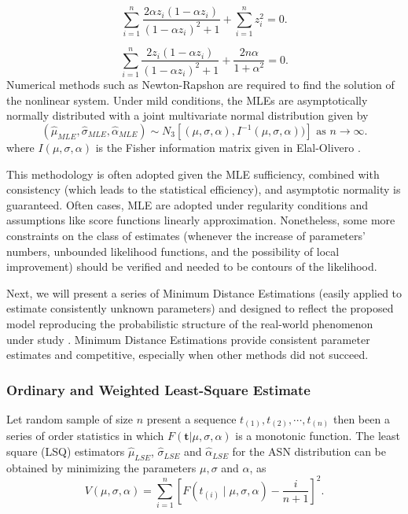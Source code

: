 \documentclass[]{interact}
\theoremstyle{plain}%
\theoremstyle{definition}
\theoremstyle{remark}
\begin{document}
\begin{equation}\label{verogg22} 
\sum_{i=1}^{n}\frac{2\alpha z_i (1-\alpha z_i)}{(1-\alpha z_i)^2+1} +  \sum_{i=1}^{n} z_i ^2=0.
\end{equation}

\begin{equation}\label{verogg23} 
\sum_{i=1}^{n}\frac{2z_i(1-\alpha z_i)}{(1-\alpha z_i)^2 + 1} +\frac{2n\alpha }{1+\alpha^2}=0 .
\end{equation}
Numerical methods such as Newton-Rapshon are required to find the solution of the nonlinear system. Under mild conditions, the MLEs  are asymptotically normally distributed with a joint multivariate normal distribution given by
\begin{equation*}
(\hat{\mu}_{MLE},\hat{\sigma}_{MLE},\hat{\alpha}_{MLE})\sim N_3\left[(\mu,\sigma,\alpha),I^{-1}(\mu,\sigma,\alpha))\right] \mbox{ as } n \to \infty .
\end{equation*}
where $I(\mu,\sigma,\alpha)$ is the Fisher information matrix given in Elal-Olivero \cite{elal2010alpha}.

This methodology is often adopted given the MLE sufficiency, combined with consistency (which leads to the statistical efficiency), and asymptotic normality is guaranteed. Often cases, MLE are adopted under regularity conditions and assumptions like score functions linearly approximation. Nonetheless, some more constraints on the class of estimates (whenever the increase of parameters' numbers, unbounded likelihood functions, and the possibility of local improvement) should be verified and needed to be contours of the likelihood.

Next, we will present a series of Minimum Distance Estimations (easily applied to estimate consistently unknown parameters) and designed to reflect the proposed model reproducing the probabilistic structure of the real-world phenomenon under study \cite{wolfowitz1957minimum}. Minimum Distance Estimations provide consistent parameter estimates and competitive, especially when other methods did not succeed.


\subsubsection{Ordinary and Weighted Least-Square Estimate}
Let random sample of size $n$ present a sequence $t_{(1)}, t_{(2)},\cdots,t_{(n)}$ then been a series of order statistics in which $F(\boldsymbol{t}| \mu,\sigma,\alpha)$ is a monotonic function. The least square (LSQ) estimators $\hat{\mu}_{LSE}$, $\hat{\sigma}_{LSE}$ and $\hat{\alpha}_{LSE}$ for the ASN distribution can be obtained by minimizing the parameters $\mu, \sigma $ and $\alpha$, as 
\begin{equation*}
V\left( \mu,\sigma,\alpha\right) = \sum_{i=1}^{n}\left[ F\left( t_{(i)}\mid \mu,\sigma,\alpha \right) - \frac {i}{n+1} \right]^{2}.
\end{equation*}
\end{document}
